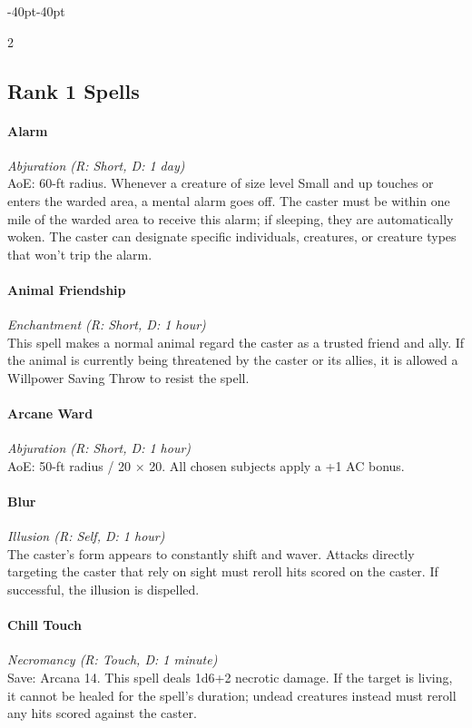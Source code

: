 \documentclass{book}
\begin{document}
\newpage
\begin{adjustwidth}{-40pt}{-40pt}
	
\begin{multicols}{2}
\subsection*{Rank 1 Spells}\label{rank-1-spells}
\small
\paragraph{Alarm}\label{alarm}
\emph{Abjuration (R: Short, D: 1 day)}\\
AoE: 60-ft radius. Whenever a creature of size level Small and up
touches or enters the warded area, a mental alarm goes off. The caster
must be within one mile of the warded area to receive this alarm; if
sleeping, they are automatically woken. The caster can designate
specific individuals, creatures, or creature types that won't trip
the alarm.

\paragraph{Animal Friendship}\label{animal-friendship}
\emph{Enchantment (R: Short, D: 1 hour)}\\
This spell makes a normal animal regard the caster as a trusted friend
and ally. If the animal is currently being threatened by the caster or
its allies, it is allowed a Willpower Saving Throw to resist the spell.

\paragraph{Arcane Ward}\label{arcane-ward}
\emph{Abjuration (R: Short, D: 1 hour)}\\
AoE: 50-ft radius / 20 × 20. All chosen subjects apply a +1 AC bonus.

\paragraph{Blur}\label{blur}
\emph{Illusion (R: Self, D: 1 hour)}\\
The caster's form appears to constantly shift and waver. Attacks
directly targeting the caster that rely on sight must reroll hits scored
on the caster. If successful, the illusion is dispelled.

\paragraph{Chill Touch}\label{chill-touch}
\emph{Necromancy (R: Touch, D: 1 minute)}\\
Save: Arcana 14. This spell deals 1d6+2 necrotic damage. If the target
is living, it cannot be healed for the spell's duration; undead
creatures instead must reroll any hits scored against the caster.


\end{multicols}
\end{adjustwidth}
\end{document}
